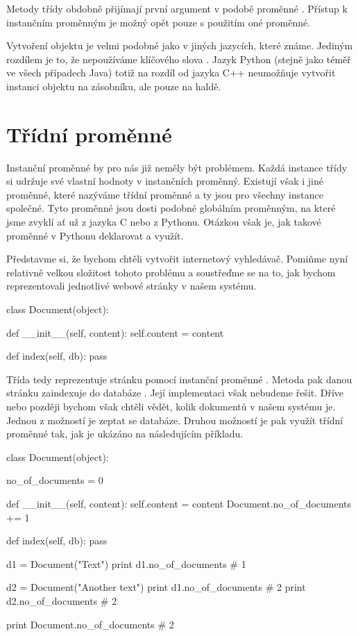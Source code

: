 Metody třídy obdobně přijímají první argument v podobě proměnné . Přístup k instančním proměnným
je možný opět pouze s použitím oné proměnné.

Vytvoření objektu je velmi podobné jako v jiných jazycích, které známe. Jediným rozdílem je to, že
nepoužíváme klíčového slova . Jazyk Python (stejně jako téměř ve všech případech Java)
totiž na rozdíl od jazyka C++ neumožňuje
vytvořit instanci objektu na zásobníku, ale pouze na haldě.

\section{Třídní proměnné}

Instanční proměnné by pro nás již neměly být problémem.
Každá instance třídy si udržuje své vlastní hodnoty v instančních proměnný.
Existují však i jiné proměnné, které nazýváme třídní proměnné a ty jsou pro všechny instance společné.
Tyto proměnné jsou dosti podobné globálním proměnným, na které jsme zvyklí ať už z jazyka C nebo z Pythonu.
Otázkou však je, jak takové proměnné v Pythonu deklarovat a využít.

Představme si, že bychom chtěli vytvořit internetový vyhledávač. Pomiňme nyní relativně velkou složitost
tohoto problému a soustřeďme se na to, jak bychom reprezentovali jednotlivé webové stránky v našem systému.

\begin{python}
class Document(object):
    
    def __init__(self, content):
        self.content = content

    def index(self, db):
        pass
\end{python}

Třída  tedy reprezentuje stránku pomocí instanční proměnné . Metoda 
pak danou stránku zaindexuje do databáze . Její implementaci však nebudeme řešit.
Dříve nebo později bychom však chtěli vědět, kolik dokumentů v našem systému je. Jednou z možností je zeptat
se databáze. Druhou možností je pak využít třídní proměnné tak, jak je ukázáno na následujícím příkladu.

\begin{python}
class Document(object):
    
    no_of_documents = 0

    def __init__(self, content):
        self.content = content
        Document.no_of_documents += 1

    def index(self, db):
        pass

d1 = Document("Text")
print d1.no_of_documents # 1

d2 = Document("Another text")
print d1.no_of_documents # 2
print d2.no_of_documents # 2

print Document.no_of_documents # 2
\end{python}

